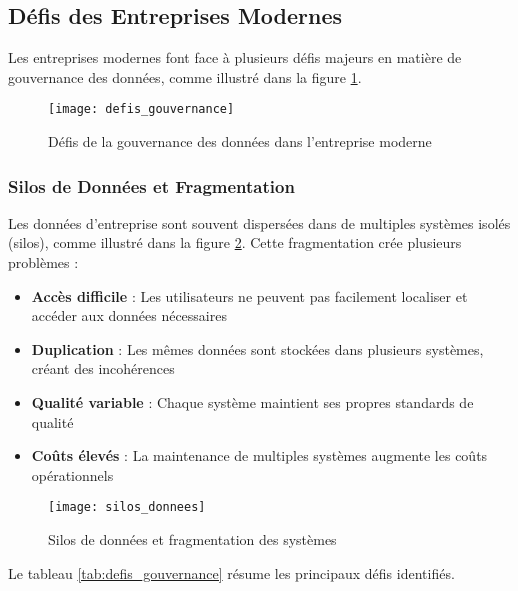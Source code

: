 \subsection{Défis des Entreprises Modernes}

Les entreprises modernes font face à plusieurs défis majeurs en matière de gouvernance des données, comme illustré dans la figure \ref{fig:defis_gouvernance}.

\begin{figure}[htpb]
\centering
\texttt{[image: defis\_gouvernance]}
\caption{Défis de la gouvernance des données dans l'entreprise moderne}
\label{fig:defis_gouvernance}
\end{figure}

\subsubsection{Silos de Données et Fragmentation}

Les données d'entreprise sont souvent dispersées dans de multiples systèmes isolés (silos), comme illustré dans la figure \ref{fig:silos_donnees}. Cette fragmentation crée plusieurs problèmes :

\begin{itemize}
    \item \textbf{Accès difficile} : Les utilisateurs ne peuvent pas facilement localiser et accéder aux données nécessaires
    \item \textbf{Duplication} : Les mêmes données sont stockées dans plusieurs systèmes, créant des incohérences
    \item \textbf{Qualité variable} : Chaque système maintient ses propres standards de qualité
    \item \textbf{Coûts élevés} : La maintenance de multiples systèmes augmente les coûts opérationnels
\end{itemize}

\begin{figure}[htpb]
\centering
\texttt{[image: silos\_donnees]}
\caption{Silos de données et fragmentation des systèmes}
\label{fig:silos_donnees}
\end{figure}

Le tableau \ref{tab:defis_gouvernance} résume les principaux défis identifiés.

